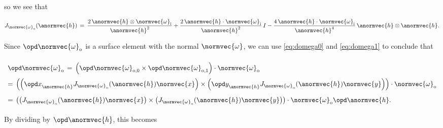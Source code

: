 so we see that

\begin{equation}
J_{\normvec{\omega}_{\text{o}}}(\anormvec{h}) \,=\,
\frac{2\,\anormvec{h}\otimes\normvec{\omega}_{\text{i}}}{\anormvec{h}^2} +
\frac{2\,\anormvec{h}\cdot\normvec{\omega}_{\text{i}}}{\anormvec{h}^2}\,I -
\frac{4\,\anormvec{h}\cdot\normvec{\omega}_{\text{i}}}{\anormvec{h}^4}\,\anormvec{h}\otimes\anormvec{h}.
\end{equation}

Since $\opd\normvec{\omega}_{\text{o}}$ is a surface element with the normal $\normvec{\omega}$, we can use  \eqref{eq:domega0} and \eqref{eq:domega1} to conclude that 

\begin{equation} \label{eq:domega}
\renewcommand*{\arraystretch}{2}
\begin{array}{l}
\displaystyle \opd\normvec{\omega}_{\text{o}} \,=\, \left(\opd\normvec{\omega}_{\text{o},0}\times\opd\normvec{\omega}_{\text{o},1}\right)\cdot\normvec{\omega}_{\text{o}} \\
=\, \left(\left(\opd x_{\anormvec{h}}^{\,}J_{\normvec{\omega}_{\text{o}}}(\anormvec{h})\normvec{x}\right)\times\left(\opd y_{\anormvec{h}}^{\,}J_{\normvec{\omega}_{\text{o}}}(\anormvec{h})\normvec{y}\right)\right)\cdot\normvec{\omega}_{\text{o}} \\
=\, \left(\left(J_{\normvec{\omega}_{\text{o}}}(\anormvec{h})\normvec{x}\right)\times\left(J_{\normvec{\omega}_{\text{o}}}(\anormvec{h})\normvec{y}\right)\right)\cdot\normvec{\omega}_{\text{o}}\opd\anormvec{h}.
\end{array}
\end{equation}

By dividing by $\opd\anormvec{h}$, this becomes


